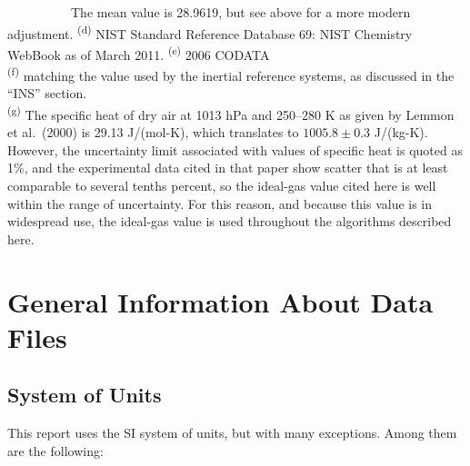 \documentclass[
  english,
]{book}
\begin{document}
~~~~~~~~~~The mean value is 28.9619, but see above for a more modern adjustment.
\textsuperscript{(d)} NIST Standard Reference Database 69: NIST Chemistry WebBook as of
March 2011.
\textsuperscript{(e)} 2006 CODATA\\
\textsuperscript{(f)} matching the value used by the inertial reference systems, as discussed
in the ``INS'' section.\\
\textsuperscript{(g)} The specific heat of dry air at 1013 hPa and 250--280 K as given
by Lemmon et al.~(2000) is 29.13 J/(mol-K), which translates to \(1005.8\pm 0.3\)
J/(kg-K). However, the uncertainty limit associated with values of
specific heat is quoted as 1\%, and the experimental data cited in
that paper show scatter that is at least comparable to several tenths
percent, so the ideal-gas value cited here is well within the range
of uncertainty. For this reason, and because this value is in widespread
use, the ideal-gas value is used throughout the algorithms described
here.

\hypertarget{general-information-about-data-files}{%
\chapter{General Information About Data Files}\label{general-information-about-data-files}}

\hypertarget{system-of-units}{%
\section{System of Units}\label{system-of-units}}

This report uses the SI system of units, but with many exceptions. Among them are the following:
\end{document}
